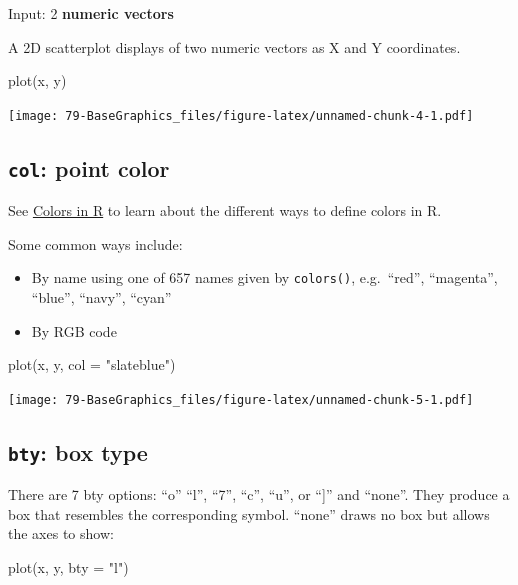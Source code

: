 \documentclass[
]{book}
\newenvironment{Shaded}{\begin{snugshade}}{\end{snugshade}}
\newcommand{\AttributeTok}[1]{\textcolor[rgb]{0.77,0.63,0.00}{#1}}
\newcommand{\FunctionTok}[1]{\textcolor[rgb]{0.00,0.00,0.00}{#1}}
\newcommand{\NormalTok}[1]{#1}
\newcommand{\StringTok}[1]{\textcolor[rgb]{0.31,0.60,0.02}{#1}}
\providecommand{\tightlist}{%
  \setlength{\itemsep}{0pt}\setlength{\parskip}{0pt}}
\begin{document}
Input: 2 \textbf{numeric vectors}

A 2D scatterplot displays of two numeric vectors as X and Y coordinates.

\begin{Shaded}
\begin{Highlighting}[]
\FunctionTok{plot}\NormalTok{(x, y)}
\end{Highlighting}
\end{Shaded}

\texttt{[image: 79-BaseGraphics\_files/figure-latex/unnamed-chunk-4-1.pdf]}

\hypertarget{col-point-color}{%
\subsection{\texorpdfstring{\textbf{\texttt{col}}: point color}{col: point color}}\label{col-point-color}}

See \protect\hyperlink{colors}{Colors in R} to learn about the different ways to define colors in R.

Some common ways include:

\begin{itemize}
\tightlist
\item
  By name using one of 657 names given by \texttt{colors()}, e.g.~``red'', ``magenta'', ``blue'', ``navy'', ``cyan''
\item
  By RGB code
\end{itemize}

\begin{Shaded}
\begin{Highlighting}[]
\FunctionTok{plot}\NormalTok{(x, y, }\AttributeTok{col =} \StringTok{"slateblue"}\NormalTok{)}
\end{Highlighting}
\end{Shaded}

\texttt{[image: 79-BaseGraphics\_files/figure-latex/unnamed-chunk-5-1.pdf]}

\hypertarget{bty-box-type}{%
\subsection{\texorpdfstring{\textbf{\texttt{bty}}: box type}{bty: box type}}\label{bty-box-type}}

There are 7 bty options: ``o'' ``l'', ``7'', ``c'', ``u'', or ``{]}'' and ``none''.
They produce a box that resembles the corresponding symbol.
``none'' draws no box but allows the axes to show:

\begin{Shaded}
\begin{Highlighting}[]
\FunctionTok{plot}\NormalTok{(x, y, }\AttributeTok{bty =} \StringTok{"l"}\NormalTok{)}
\end{Highlighting}
\end{Shaded}
\end{document}
